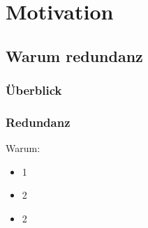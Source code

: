 \section{Motivation}
\subsection{Warum redundanz}
\begin{frame}
	\frametitle{Überblick}
	\tableofcontents[currentsubsection]
\end{frame}

\begin{frame}
	\frametitle{Redundanz}
	Warum:
	\begin{itemize}
			\item 1 
			\item 2
			\item 2
	\end{itemize}	

\end{frame}

